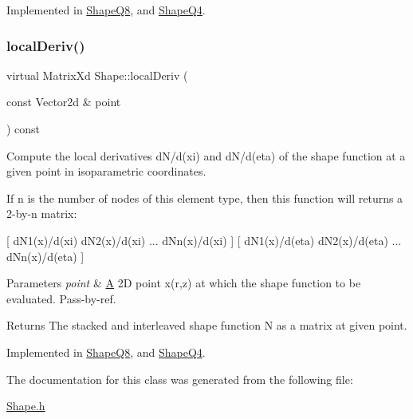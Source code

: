 Implemented in \mbox{\hyperlink{class_shape_q8_a30891417d7ba6d6457b8b5567add07f5}{Shape\+Q8}}, and \mbox{\hyperlink{class_shape_q4_a51233dd1caaabbe8404c06b5b0db5755}{Shape\+Q4}}.

\mbox{\label{class_shape_a55575394f656e3ee4b5ac37ea04af8c9}} 
\subsubsection{\texorpdfstring{local\+Deriv()}{localDeriv()}}
{\footnotesize\ttfamily virtual Matrix\+Xd Shape\+::local\+Deriv (\begin{DoxyParamCaption}\item[{const Vector2d \&}]{point }\end{DoxyParamCaption}) const\hspace{0.3cm}{\ttfamily [pure virtual]}}



Compute the local derivatives d\+N/d(xi) and d\+N/d(eta) of the shape function at a given point in isoparametric coordinates. 

If n is the number of nodes of this element type, then this function will returns a 2-\/by-\/n matrix\+:

\mbox{[} d\+N1(x)/d(xi) d\+N2(x)/d(xi) ... d\+Nn(x)/d(xi) \mbox{]} \mbox{[} d\+N1(x)/d(eta) d\+N2(x)/d(eta) ... d\+Nn(x)/d(eta) \mbox{]}


\begin{DoxyParams}{Parameters}
{\em point} & \mbox{\hyperlink{class_a}{A}} 2D point x(r,z) at which the shape function to be evaluated. Pass-\/by-\/ref. \\
\hline
\end{DoxyParams}
\begin{DoxyReturn}{Returns}
The stacked and interleaved shape function N as a matrix at given point. 
\end{DoxyReturn}


Implemented in \mbox{\hyperlink{class_shape_q8_ac62182e6804216500c2b290efd5fd06a}{Shape\+Q8}}, and \mbox{\hyperlink{class_shape_q4_ad3e1f5e25aee96cd21b1c8770c35afd0}{Shape\+Q4}}.



The documentation for this class was generated from the following file\+:\begin{DoxyCompactItemize}
\item 
\mbox{\hyperlink{_shape_8h}{Shape.\+h}}\end{DoxyCompactItemize}
